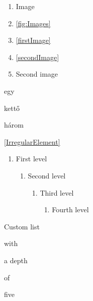 \documentclass{article}
\begin{document}
\listoftables
\listoffigures

\begin{enumerate}
	\item Image
	\item \ref{fig:Images}
	\item \ref{firstImage}
	\item \ref{secondImage}
	\item Second image
\end{enumerate}

\begin{itemize*}[itemjoin*={\hspace{1em}és}]
	\item egy
	\item kettő
	\item három
\end{itemize*}

\ref{IrregularElement}

\begin{enumerate}[label=(\arabic*)]
	\item First level
	
	\begin{enumerate}[label*=(\arabic*)]
		\item Second level
		
		\begin{enumerate}[label*=(\arabic*)]
			\item Third level
		
			\begin{enumerate}[label*=(\arabic*)]
				\item Fourth level		
			\end{enumerate}
		\end{enumerate}
	\end{enumerate}
\end{enumerate}	

\hulipsum[2]

\begin{enuma}[series=firstList]
	\item Custom list
	\begin{enuma}[series=secondList]
		\item with
		\begin{enuma}[series=thirdList]
			\item a depth
			\begin{enuma}[series=fourthList]
				\item of
				\begin{enuma}[series=fifthList]
					\item five
				\end{enuma}
			\end{enuma}
		\end{enuma}
	\end{enuma}
\end{enuma}
\end{document}
